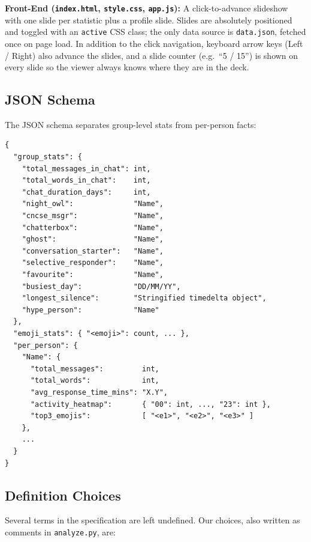 \documentclass[12pt]{article}
\begin{document}
\textbf{Front-End (\texttt{index.html}, \texttt{style.css}, \texttt{app.js}):}
A click-to-advance slideshow with one slide per statistic plus a profile slide.
Slides are absolutely positioned and toggled with an \texttt{active} CSS class;
the only data source is \texttt{data.json}, fetched once on page load. In
addition to the click navigation, keyboard arrow keys (Left / Right) also
advance the slides, and a slide counter (e.g.\ ``5 / 15'') is shown on every
slide so the viewer always knows where they are in the deck.

\subsection{JSON Schema}

The JSON schema separates group-level stats from per-person facts:

\begin{verbatim}
{
  "group_stats": {
    "total_messages_in_chat": int,
    "total_words_in_chat":    int,
    "chat_duration_days":     int,
    "night_owl":              "Name",
    "cncse_msgr":             "Name",
    "chatterbox":             "Name",
    "ghost":                  "Name",
    "conversation_starter":   "Name",
    "selective_responder":    "Name",
    "favourite":              "Name",
    "busiest_day":            "DD/MM/YY",
    "longest_silence":        "Stringified timedelta object",
    "hype_person":            "Name"
  },
  "emoji_stats": { "<emoji>": count, ... },
  "per_person": {
    "Name": {
      "total_messages":         int,
      "total_words":            int,
      "avg_response_time_mins": "X.Y",
      "activity_heatmap":       { "00": int, ..., "23": int },
      "top3_emojis":            [ "<e1>", "<e2>", "<e3>" ]
    },
    ...
  }
}
\end{verbatim}


\subsection{Definition Choices}

Several terms in the specification are left undefined. Our
choices, also written as comments in \texttt{analyze.py}, are:
\end{document}
